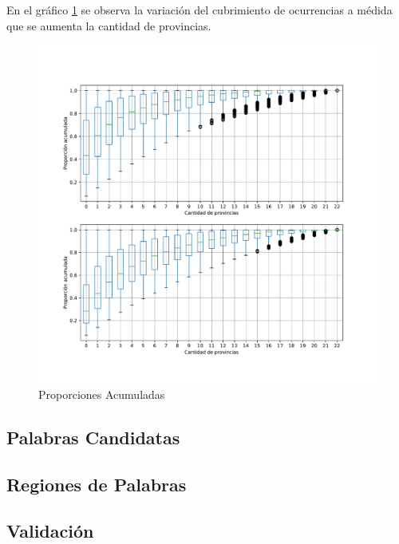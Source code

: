 En el gráfico \ref{fig:propAcum5000} se observa la variación del cubrimiento de ocurrencias a médida que se aumenta la cantidad de provincias. 


\begin{figure}[ht]
\centering
\includegraphics[scale=0.4]{./images/PropAcum5000.pdf}
\caption{Proporciones Acumuladas} 
\label{fig:propAcum5000} 
\end{figure}



\subsection{Palabras Candidatas} %
\label{sub:palabras_candidatas}

\subsection{Regiones de Palabras} %
\label{sub:regiones_de_palabras}


\subsection{Validación}